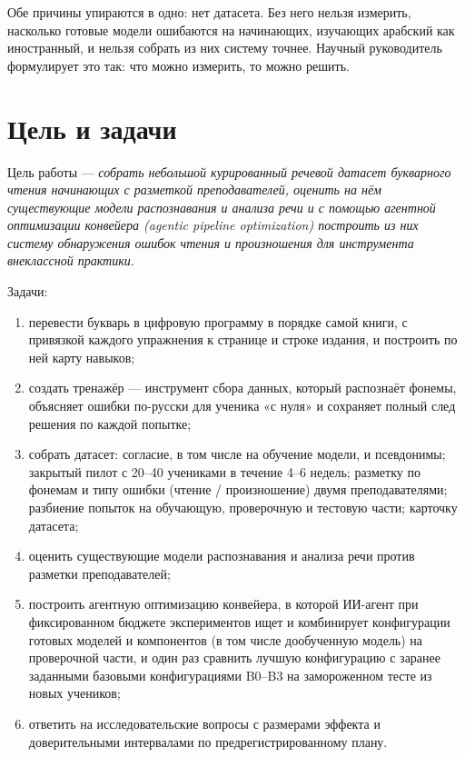 Обе причины упираются в одно: нет датасета. Без него нельзя измерить, насколько готовые модели ошибаются на
начинающих, изучающих арабский как иностранный, и нельзя собрать из них систему точнее. Научный руководитель
формулирует это так: что можно измерить, то можно решить.

\section{Цель и задачи}

Цель работы --- \emph{собрать небольшой курированный речевой датасет букварного чтения начинающих с разметкой
преподавателей, оценить на нём существующие модели распознавания и анализа речи и с помощью агентной
оптимизации конвейера (agentic pipeline optimization) построить из них систему обнаружения ошибок чтения и
произношения для инструмента внеклассной практики}.

Задачи:
\begin{enumerate}[label=З\arabic*.]
  \item перевести букварь в цифровую программу в порядке самой книги, с привязкой каждого упражнения к
    странице и строке издания, и построить по ней карту навыков;
  \item создать тренажёр --- инструмент сбора данных, который распознаёт фонемы, объясняет ошибки по-русски
    для ученика «с нуля» и сохраняет полный след решения по каждой попытке;
  \item собрать датасет: согласие, в том числе на обучение модели, и псевдонимы; закрытый пилот с
    20--40 учениками в течение 4--6 недель; разметку по фонемам и типу ошибки (чтение / произношение) двумя преподавателями; разбиение попыток на
    обучающую, проверочную и тестовую части; карточку датасета;
  \item оценить существующие модели распознавания и анализа речи против разметки преподавателей;
  \item построить агентную оптимизацию конвейера, в которой ИИ-агент при фиксированном бюджете экспериментов
    ищет и комбинирует конфигурации готовых моделей и компонентов (в том числе дообученную модель) на
    проверочной части, и один раз сравнить лучшую конфигурацию с заранее заданными базовыми конфигурациями
    B0--B3 на замороженном тесте из новых учеников;
  \item ответить на исследовательские вопросы с размерами эффекта и доверительными интервалами по
    предрегистрированному плану.
\end{enumerate}

